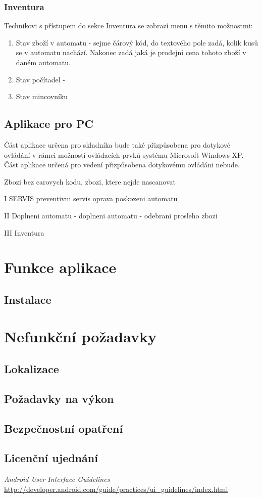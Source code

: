 \documentclass[a4paper,10pt]{article}
\begin{document}
\subsubsection{Inventura}
Technikovi s přístupem do sekce Inventura se zobrazí menu s těmito možnostmi:
\begin{enumerate}
	\item Stav zboží v automatu - sejme čárový kód, do textového pole zadá, kolik kusů se v automatu nachází. Nakonec zadá jaká je prodejní cena tohoto zboží v daném automatu.
	\item Stav počítadel - 
	\item Stav mincovníku
\end{enumerate}


\subsection{Aplikace pro PC}

Část aplikace určena pro skladníka bude také přizpůsobena pro dotykové ovládání v rámci možností ovládacích prvků systému Microsoft Windows XP. Část aplikace určená pro vedení přizpůsobena dotykovému ovládáni nebude.


Zbozi bez carovych kodu, zbozi, ktere nejde nascanovat


I SERVIS
preventivni servis
oprava
poskozeni automatu

II Doplneni automatu
- doplneni automatu
- odebrani prosleho zbozi

III Inventura

\section{Funkce aplikace}
\subsection{Instalace}
\section{Nefunkční požadavky}
\subsection{Lokalizace}
\subsection{Požadavky na výkon}
\subsection{Bezpečnostní opatření}
\subsection{Licenční ujednání}
\begin{thebibliography}{1}
	{\em Android User Interface Guidelines}
		\url{http://developer.android.com/guide/practices/ui_guidelines/index.html}
\end{thebibliography}
\end{document}
